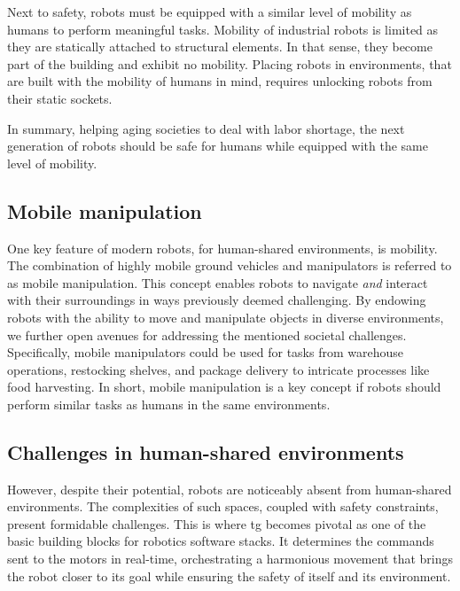 Next to
safety, robots must be equipped with a similar level of
mobility as humans to perform meaningful tasks. Mobility of
industrial robots is limited as they are statically
attached to structural elements. In that sense, they become
part of the building and exhibit no mobility. Placing
robots in environments, that are built with the mobility of
humans in mind, requires unlocking robots from their static
sockets.

In summary, helping aging societies to deal with labor
shortage, the next generation of robots should be safe for
humans while equipped with the same level of mobility.

\subsection{Mobile manipulation}
\label{sub:mobile_manipulation}

One key feature of modern robots, for human-shared
environments, is mobility. The combination of highly mobile
ground vehicles and manipulators is referred to as mobile
manipulation. This concept enables robots to navigate
\textit{and}
interact with their surroundings in ways previously deemed
challenging. By endowing robots with the ability to move and
manipulate objects in diverse environments, we further open
avenues for addressing the mentioned societal challenges.
Specifically, mobile manipulators could be used for tasks
from warehouse operations, restocking shelves, and package
delivery to intricate processes like food harvesting.
In short, mobile manipulation is a key concept if robots
should perform similar tasks as humans in the same
environments.


\subsection{Challenges in human-shared environments}
\label{sub:challenges_in_human_shared_environments}
%
However, despite their potential, robots are noticeably
absent from human-shared environments. The complexities of
such spaces, coupled with safety constraints, present
formidable challenges. This is where \ac{tg}
becomes pivotal as one of the basic building blocks for
robotics software stacks. It determines the commands sent to
the motors in real-time, orchestrating a harmonious movement
that brings the robot closer to its goal while ensuring the
safety of itself and its environment.

